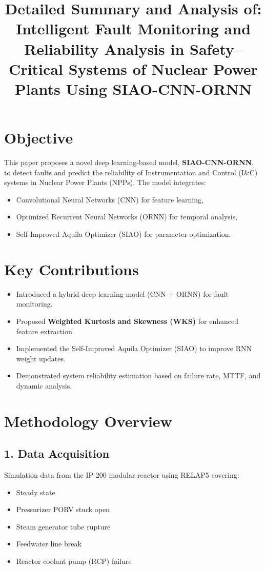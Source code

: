\documentclass[12pt]{article}
\title{Detailed Summary and Analysis of: \\ \textbf{Intelligent Fault Monitoring and Reliability Analysis in Safety--Critical Systems of Nuclear Power Plants Using SIAO-CNN-ORNN}}
\author{}
\date{}
\begin{document}
\maketitle

\section*{Objective}
This paper proposes a novel deep learning-based model, \textbf{SIAO-CNN-ORNN}, to detect faults and predict the reliability of Instrumentation and Control (I\&C) systems in Nuclear Power Plants (NPPs). The model integrates:
\begin{itemize}
    \item Convolutional Neural Networks (CNN) for feature learning,
    \item Optimized Recurrent Neural Networks (ORNN) for temporal analysis,
    \item Self-Improved Aquila Optimizer (SIAO) for parameter optimization.
\end{itemize}

\section*{Key Contributions}
\begin{itemize}
    \item Introduced a hybrid deep learning model (CNN + ORNN) for fault monitoring.
    \item Proposed \textbf{Weighted Kurtosis and Skewness (WKS)} for enhanced feature extraction.
    \item Implemented the Self-Improved Aquila Optimizer (SIAO) to improve RNN weight updates.
    \item Demonstrated system reliability estimation based on failure rate, MTTF, and dynamic analysis.
\end{itemize}

\section*{Methodology Overview}

\subsection*{1. Data Acquisition}
Simulation data from the IP-200 modular reactor using RELAP5 covering:
\begin{itemize}
    \item Steady state
    \item Pressurizer PORV stuck open
    \item Steam generator tube rupture
    \item Feedwater line break
    \item Reactor coolant pump (RCP) failure
\end{itemize}
\end{document}
